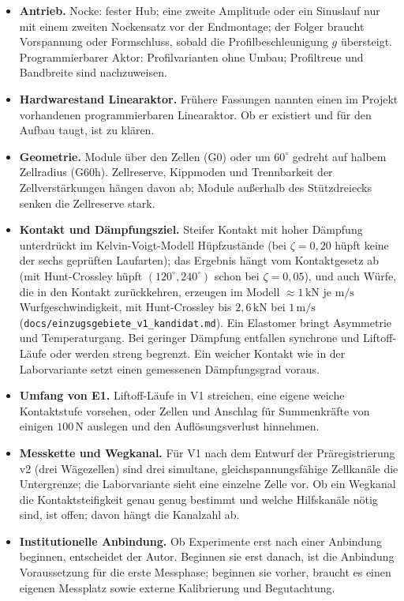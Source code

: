 \documentclass[12pt,a4paper]{report}
\begin{document}
\begin{itemize}
\item \textbf{Antrieb.} Nocke: fester Hub; eine zweite Amplitude oder ein
      Sinuslauf nur mit einem zweiten Nockensatz vor der Endmontage; der
      Folger braucht Vorspannung oder Formschluss, sobald die
      Profilbeschleunigung $g$ übersteigt. Programmierbarer Aktor:
      Profilvarianten ohne Umbau; Profiltreue und Bandbreite sind
      nachzuweisen.
\item \textbf{Hardwarestand Linearaktor.} Frühere Fassungen nannten einen
      im Projekt vorhandenen programmierbaren Linearaktor. Ob er existiert
      und für den Aufbau taugt, ist zu klären.
\item \textbf{Geometrie.} Module über den Zellen (G0) oder um $60^\circ$
      gedreht auf halbem Zellradius (G60h). Zellreserve, Kippmoden und
      Trennbarkeit der Zellverstärkungen hängen davon ab; Module außerhalb
      des Stützdreiecks senken die Zellreserve stark.
\item \textbf{Kontakt und Dämpfungsziel.} Steifer Kontakt mit hoher
      Dämpfung unterdrückt im Kelvin-Voigt-Modell Hüpfzustände (bei
      $\zeta = 0{,}20$ hüpft keine der sechs geprüften Laufarten); das
      Ergebnis hängt vom Kontaktgesetz ab (mit Hunt-Crossley hüpft
      $(120^\circ, 240^\circ)$ schon bei $\zeta = 0{,}05$), und auch
      Würfe, die in den Kontakt zurückkehren, erzeugen im Modell
      $\approx 1\,\mathrm{kN}$ je $\mathrm{m/s}$ Wurfgeschwindigkeit, mit
      Hunt-Crossley bis $2{,}6\,\mathrm{kN}$ bei $1\,\mathrm{m/s}$
      (\texttt{docs/einzugsgebiete\_v1\_kandidat.md}). Ein Elastomer bringt
      Asymmetrie und Temperaturgang. Bei geringer Dämpfung entfallen
      synchrone und Liftoff-Läufe oder werden streng begrenzt. Ein weicher
      Kontakt wie in der Laborvariante setzt einen gemessenen
      Dämpfungsgrad voraus.
\item \textbf{Umfang von E1.} Liftoff-Läufe in V1 streichen, eine eigene
      weiche Kontaktstufe vorsehen, oder Zellen und Anschlag für
      Summenkräfte von einigen $100\,\mathrm{N}$ auslegen und den
      Auflösungsverlust hinnehmen.
\item \textbf{Messkette und Wegkanal.} Für V1 nach dem Entwurf der
      Präregistrierung v2 (drei Wägezellen) sind drei simultane,
      gleichspannungsfähige Zellkanäle die Untergrenze; die Laborvariante
      sieht eine einzelne Zelle vor. Ob ein Wegkanal die
      Kontaktsteifigkeit genau genug bestimmt und welche Hilfskanäle
      nötig sind, ist offen; davon hängt die Kanalzahl ab.
\item \textbf{Institutionelle Anbindung.} Ob Experimente erst nach einer
      Anbindung beginnen, entscheidet der Autor. Beginnen sie erst
      danach, ist die Anbindung Voraussetzung für die erste Messphase;
      beginnen sie vorher, braucht es einen eigenen Messplatz sowie
      externe Kalibrierung und Begutachtung.
\end{itemize}
\end{document}
